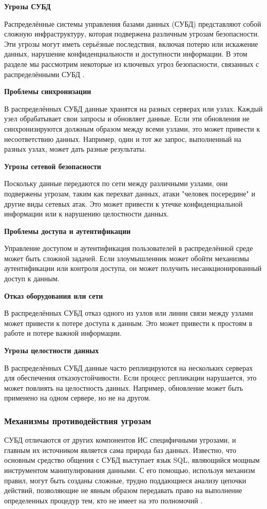 \bigbreak
\textbf{Угрозы СУБД}

Распределённые системы управления базами данных (СУБД) представляют собой сложную инфраструктуру, которая подвержена различным угрозам безопасности. Эти угрозы могут иметь серьёзные последствия, включая потерю или искажение данных, нарушение конфиденциальности и доступности информации. В этом разделе мы рассмотрим некоторые из ключевых угроз безопасности, связанных с распределёнными СУБД \autocite{DistrDBThreats}.

\textbf{Проблемы синхронизации}

В распределённых СУБД данные хранятся на разных серверах или узлах. Каждый узел обрабатывает свои запросы и обновляет данные. Если эти обновления не синхронизируются должным образом между всеми узлами, это может привести к несоответствию данных. Например, один и тот же запрос, выполненный на разных узлах, может дать разные результаты.

\textbf{Угрозы сетевой безопасности}

Поскольку данные передаются по сети между различными узлами, они подвержены угрозам, таким как перехват данных, атаки "человек посередине" и другие виды сетевых атак. Это может привести к утечке конфиденциальной информации или к нарушению целостности данных.

\textbf{Проблемы доступа и аутентификации}

Управление доступом и аутентификация пользователей в распределённой среде может быть сложной задачей. Если злоумышленник может обойти механизмы аутентификации или контроля доступа, он может получить несанкционированный доступ к данным.

\textbf{Отказ оборудования или сети}

В распределённых СУБД отказ одного из узлов или линии связи между узлами может привести к потере доступа к данным. Это может привести к простоям в работе и потере важной информации.

\textbf{Угрозы целостности данных}

В распределённых СУБД данные часто реплицируются на нескольких серверах для обеспечения отказоустойчивости. Если процесс репликации нарушается, это может повлиять на целостность данных. Например, обновление может быть применено на одном сервере, но не на другом.

\subsubsection{Механизмы противодействия угрозам}
СУБД отличаются от других компонентов ИС специфичными угрозами, и главным их источником является
сама природа баз данных. Известно, что основным средство общения с СУБД выступает язык SQL,
являющийся мощным инструментом манипулирования данными. С его помощью, используя механизм правил, могут
быть созданы сложные, трудно поддающиеся анализу цепочки действий, позволяющие не явным образом передавать
право на выполнение определенных процедур тем, кто не имеет на это полномочий \autocite{DistrDBThreats}.

